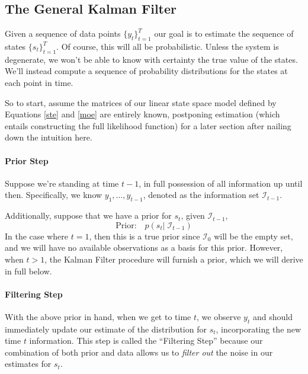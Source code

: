 \documentclass[a4paper,12pt]{article}
\begin{document}
\subsection{The General Kalman Filter}

Given a sequence of data points $\{y_t\}_{t=1}^T$ our goal is to estimate the sequence of states $\{s_t\}^T_{t=1}$. Of course, this will all be probabilistic. Unless the system is degenerate, we won't be able to know with certainty the true value of the states. We'll instead compute a sequence of probability distributions for the states at each point in time. 

So to start, assume the matrices of our linear state space model defined by Equations \ref{ste} and \ref{moe} are entirely known, postponing estimation (which entails constructing the full likelihood function) for a later section after nailing down the intuition here. 


\paragraph{Prior Step} Suppose we're standing at time $t-1$, in full possession of all information up until then. Specifically, we know $y_1, \ldots, y_{t-1}$, denoted as the information set $\mathcal{I}_{t-1}$. 

Additionally, suppose that we have a prior for $s_t$, given $\mathcal{I}_{t-1}$,
\begin{equation}
  \text{Prior:} \quad p(s_t | \; \mathcal{I}_{t-1}) 
  \label{pri}
\end{equation}
In the case where $t=1$, then this is a true prior since $\mathcal{I}_{0}$ will be the empty set, and we will have no available observations as a basis for this prior. However, when $t>1$, the Kalman Filter procedure will furnish a prior, which we will derive in full below.

\paragraph{Filtering Step}
With the above prior in hand, when we get to time $t$, we observe $y_t$ and should immediately update our estimate of the distribution for $s_t$, incorporating the new time $t$ information. This step is called the ``Filtering Step'' because our combination of both prior and data allows us to \emph{filter out} the noise in our estimates for $s_t$. 
\end{document}
